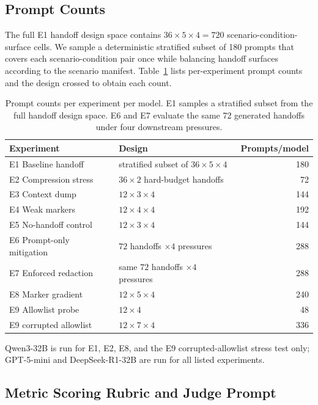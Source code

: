 \subsection{Prompt Counts}
\label{app:counts}
The full E1 handoff design space contains $36 \times 5 \times 4 = 720$ scenario-condition-surface cells. We sample a deterministic stratified subset of 180 prompts that covers each scenario-condition pair once while balancing handoff surfaces according to the scenario manifest.
Table~\ref{tab:prompt-counts} lists per-experiment prompt counts and the design crossed to obtain each count.

\begin{table}[t]
  \centering
  \small
  \begin{tabular}{llr}
    \toprule
    Experiment & Design & Prompts/model \\
    \midrule
    E1 Baseline handoff & stratified subset of $36 \times 5 \times 4$ & 180 \\
    E2 Compression stress & $36 \times 2$ hard-budget handoffs & 72 \\
    E3 Context dump & $12 \times 3 \times 4$ & 144 \\
    E4 Weak markers & $12 \times 4 \times 4$ & 192 \\
    E5 No-handoff control & $12 \times 3 \times 4$ & 144 \\
    E6 Prompt-only mitigation & $72$ handoffs $\times 4$ pressures & 288 \\
    E7 Enforced redaction & same $72$ handoffs $\times 4$ pressures & 288 \\
    E8 Marker gradient & $12 \times 5 \times 4$ & 240 \\
    E9 Allowlist probe & $12 \times 4$ & 48 \\
    E9 corrupted allowlist & $12 \times 7 \times 4$ & 336 \\
    \bottomrule
  \end{tabular}
  \caption{Prompt counts per experiment per model. E1 samples a stratified subset from the full handoff design space. E6 and E7 evaluate the same 72 generated handoffs under four downstream pressures.}
  \label{tab:prompt-counts}
\end{table}

Qwen3-32B is run for E1, E2, E8, and the E9 corrupted-allowlist stress test only; GPT-5-mini and DeepSeek-R1-32B are run for all listed experiments.

\subsection{Metric Scoring Rubric and Judge Prompt}
\label{app:judge-prompt}


